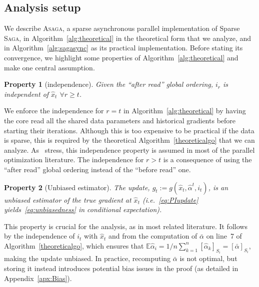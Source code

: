\documentclass[twoside]{article}
\newcommand{\E}{\mathbb{E}}
\newcommand{\ASAGA}{\textsc{Asaga}}
\newcommand{\SAGA}{\textsc{Saga}}
\newtheorem{prop}{Property}
\begin{document}
\vspace{-1mm}
\subsection{Analysis setup} \label{ssec:convergence}
\vspace{-2mm}
We describe \ASAGA, a sparse asynchronous parallel implementation of Sparse \SAGA, in Algorithm~\ref{alg:theoretical} in the theoretical form that we analyze, and in Algorithm~\ref{alg:sagasync} as its practical implementation.
Before stating its convergence, we highlight some properties of Algorithm~\ref{alg:theoretical} and make one central assumption. 

\begin{prop} [independence]
Given the ``after read'' global ordering, $i_r$ is independent of $\hat{x}_t$ $\forall r \geq t$.
\label{independence}
\end{prop}
\vspace{-2mm}
We enforce the independence for $r = t$ in Algorithm~\ref{alg:theoretical} by having the core read all the shared data parameters and historical gradients before starting their iterations. 
Although this is too expensive to be practical if the data is sparse, this is required by the theoretical Algorithm~\ref{theoreticalgo} that we can analyze. 
As~\citet{mania} stress, this independence property is assumed in most of the parallel optimization literature. The independence for $r > t$ is a consequence of using the ``after read'' global ordering instead of the ``before read'' one.

\begin{prop}[Unbiased estimator]
The update, $g_t := g(\hat x_t, \hat \alpha^t, i_t)$, is an unbiased estimator of the true gradient at $\hat x_t$ (i.e.~\eqref{eq:PIupdate} yields~\eqref{eq:unbiasedness} in conditional expectation).
\end{prop}
\vspace{-2mm}
This property is crucial for the analysis, as in most related literature. 
It follows by the independence of $i_t$ with $\hat{x}_t$ and from the computation of $\bar \alpha$ on line~7 of Algorithm~\ref{theoreticalgo}, which ensures that $\E \hat \alpha_i = 1/n \sum_{k=1}^n [\hat \alpha_k]_{S_i} = [\bar \alpha]_{S_i}$, making the update unbiased. In practice, recomputing $\bar \alpha$ is not optimal, but storing it instead introduces potential bias issues in the proof (as detailed in Appendix~\ref{apx:Bias}). 
\end{document}
